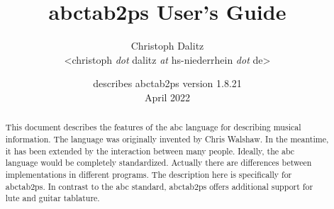 \documentclass[a4paper]{article}
\begin{document}
\title{\vspace*{-8mm}
abctab2ps User's Guide}
\author{
Christoph Dalitz
\\\textless christoph {\it dot} dalitz {\it at} hs-niederrhein {\it dot} de\textgreater
}
\date{describes abctab2ps version 1.8.21\\[1.0ex]
April 2022}
\maketitle


\begin{abstract}
\noindent
This document describes the features of the abc language for describing
musical information. The language was originally invented by Chris Walshaw.
In the meantime, it has been extended by the interaction between
many people. Ideally, the abc language would be completely standardized.
Actually there are differences between implementations in different programs.
The description here is specifically for abctab2ps. In contrast to the
abc standard, abctab2ps offers additional support for lute and guitar
tablature.
\end{abstract}


\tableofcontents

\end{document}
